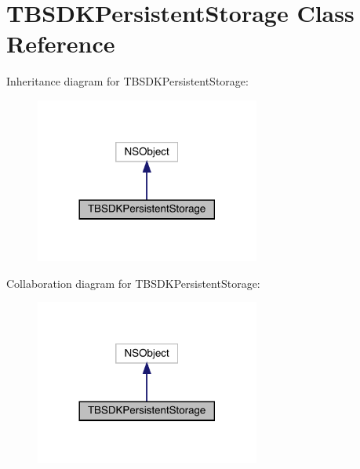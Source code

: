 \hypertarget{interface_t_b_s_d_k_persistent_storage}{}\section{T\+B\+S\+D\+K\+Persistent\+Storage Class Reference}
\label{interface_t_b_s_d_k_persistent_storage}


Inheritance diagram for T\+B\+S\+D\+K\+Persistent\+Storage\+:\nopagebreak
\begin{figure}[H]
\begin{center}
\leavevmode
\includegraphics[width=209pt]{interface_t_b_s_d_k_persistent_storage__inherit__graph}
\end{center}
\end{figure}


Collaboration diagram for T\+B\+S\+D\+K\+Persistent\+Storage\+:\nopagebreak
\begin{figure}[H]
\begin{center}
\leavevmode
\includegraphics[width=209pt]{interface_t_b_s_d_k_persistent_storage__coll__graph}
\end{center}
\end{figure}
